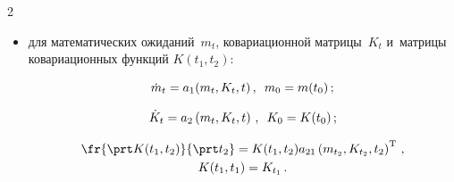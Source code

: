 \begin{multicols}{2}
\begin{itemize}
\begin{equation}
\begin{array}{c}
    \end{array}

    \right\}

    \label{e3.4-s}

    \end{equation}

где

    $$

    \bar \la =\left[ \la_1^{\mathrm{T}}\la_2^{\mathrm{T}}\right]^{\mathrm{T}}\,; \enskip\bar m_2 = \left[ m_{t_1}^{\mathrm{T}} m_{t_2}^{\mathrm{T}}\right]^{\mathrm{T}}\,;\

    $$

    $$

    \bar K_2= \begin{bmatrix}

    K\left(t_1, t_1\right)& K\left(t_1, t_2\right)\\

    K\left(t_2, t_1\right)& K\left(t_2, t_2\right)\end{bmatrix}\,;

    $$



\item для математических ожиданий~$m_t$, ковариационной матрицы~$K_t$ и~матрицы ковариационных функций $K(t_1, t_2)$:

    \begin{equation}

    \dot m_t = a_1 (m_t, K_t, t)\,,\enskip m_0 = m(t_0)\,;\label{e3.5-s}

    \end{equation}

    \begin{equation}

\dot K_t = a_2 \left(m_t, K_t, t\right)\,,\enskip K_0 = K(t_0)\,;\label{e3.6-s}

\end{equation}



\vspace*{-12pt}

\begin{multline}

   \fr{\prt K(t_1, t_2)}{\prt t_2 }= K(t_1, t_2) a_{21} \left(m_{t_2}, K_{t_2}, t_2\right)^{\mathrm{T}}\,,\\

K(t_1, t_1) = K_{t_1}\,.

    \label{e3.7-s}

   \end{multline}


\end{itemize}
\end{multicols}
